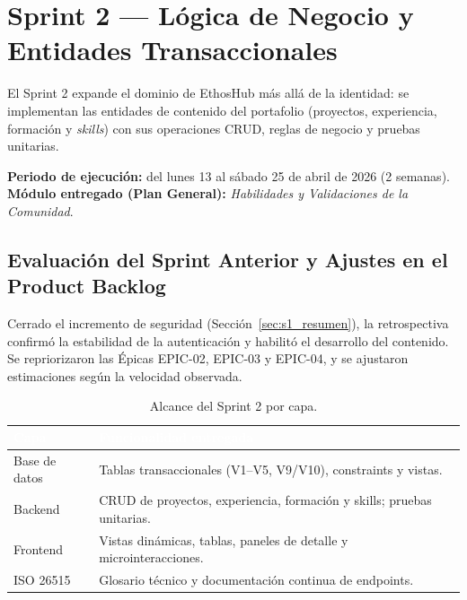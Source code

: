 \chapter{Sprint 2 — Lógica de Negocio y Entidades Transaccionales}
\label{cap:sprint2}

El Sprint 2 expande el dominio de EthosHub más allá de la identidad: se implementan las
entidades de contenido del portafolio (proyectos, experiencia, formación y \textit{skills}) con
sus operaciones CRUD, reglas de negocio y pruebas unitarias.\par

\textbf{Periodo de ejecución:} del lunes 13 al sábado 25 de abril de 2026 (2 semanas).
\textbf{Módulo entregado (Plan General):} \textit{Habilidades y Validaciones de la Comunidad}.\par

\section{Evaluación del Sprint Anterior y Ajustes en el Product Backlog}
\label{sec:s2_resumen}

Cerrado el incremento de seguridad (Sección~\ref{sec:s1_resumen}), la retrospectiva confirmó la
estabilidad de la autenticación y habilitó el desarrollo del contenido. Se repriorizaron las
Épicas EPIC-02, EPIC-03 y EPIC-04, y se ajustaron estimaciones según la velocidad observada.

\begin{table}[!ht]
    \centering
    \renewcommand{\arraystretch}{1.35}
    \fontsize{9}{10.8}\selectfont\sffamily
    \begin{tabularx}{\textwidth}{|l|X|}
        \hline
        \rowcolor{colorPrimario}
        \textcolor{white}{\textbf{Capa}} & \textcolor{white}{\textbf{Funcionalidad entregada}} \\ \hline
        Base de datos & Tablas transaccionales (V1--V5, V9/V10), constraints y vistas. \\ \hline
        \rowcolor{grisTecnico}
        Backend & CRUD de proyectos, experiencia, formación y skills; pruebas unitarias. \\ \hline
        Frontend & Vistas dinámicas, tablas, paneles de detalle y microinteracciones. \\ \hline
        \rowcolor{grisTecnico}
        ISO 26515 & Glosario técnico y documentación continua de endpoints. \\ \hline
    \end{tabularx}
    \caption{Alcance del Sprint 2 por capa.}
    \label{tab:s2_alcance}
\end{table}

